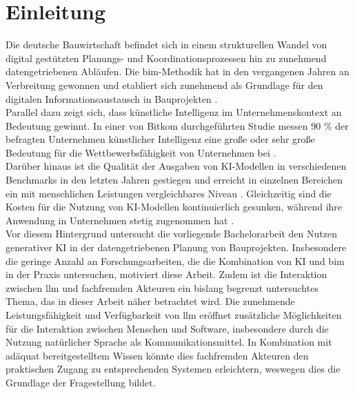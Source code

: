 \clearpage

\chapter{\textbf{Einleitung}}
\label{chap:introduction}

Die deutsche Bauwirtschaft befindet sich in einem strukturellen Wandel von digital gestützten Planungs- und Koordinationsprozessen hin zu zunehmend datengetriebenen Abläufen.
Die \gls{bim}-Methodik hat in den vergangenen Jahren an Verbreitung gewonnen und etabliert sich zunehmend als Grundlage für den digitalen Informationsaustausch in Bauprojekten \cite[Abb. 2]{vorbeck2022current}. \\

Parallel dazu zeigt sich, dass künstliche Intelligenz im Unternehmenskontext an Bedeutung gewinnt.
In einer von Bitkom durchgeführten Studie messen 90 \% der befragten Unternehmen künstlicher Intelligenz eine große oder sehr große Bedeutung für die Wettbewerbsfähigkeit von Unternehmen bei \cite[Abb. 14]{bitkom2025digitalisierung-der-wirtschaft}. \\

Darüber hinaus ist die Qualität der Ausgaben von KI-Modellen in verschiedenen Benchmarks in den letzten Jahren gestiegen
und erreicht in einzelnen Bereichen ein mit menschlichen Leistungen vergleichbares Niveau \cite[Abb. 2.1.33]{maslej2025artificialintelligenceindexreport}.
Gleichzeitig sind die Kosten für die Nutzung von KI-Modellen kontinuierlich gesunken,
während ihre Anwendung in Unternehmen stetig zugenommen hat \cite[Abb. 1.3.22]{maslej2025artificialintelligenceindexreport} \cite[Abb. 4.4.1]{maslej2025artificialintelligenceindexreport}. \\

Vor diesem Hintergrund untersucht die vorliegende Bachelorarbeit den Nutzen generativer KI in der datengetriebenen Planung von Bauprojekten.
Insbesondere die geringe Anzahl an Forschungsarbeiten, die die Kombination von KI und \gls{bim} in der Praxis untersuchen, motiviert diese Arbeit.
Zudem ist die Interaktion zwischen \gls{llm} und fachfremden Akteuren ein bislang begrenzt untersuchtes Thema, das in dieser Arbeit näher betrachtet wird.
Die zunehmende Leistungsfähigkeit und Verfügbarkeit von \gls{llm} eröffnet zusätzliche Möglichkeiten für die Interaktion zwischen Menschen und Software, insbesondere durch die Nutzung natürlicher Sprache als Kommunikationsmittel.
In Kombination mit adäquat bereitgestelltem Wissen könnte dies fachfremden Akteuren den praktischen Zugang zu entsprechenden Systemen erleichtern,
weswegen dies die Grundlage der Fragestellung bildet. \\

